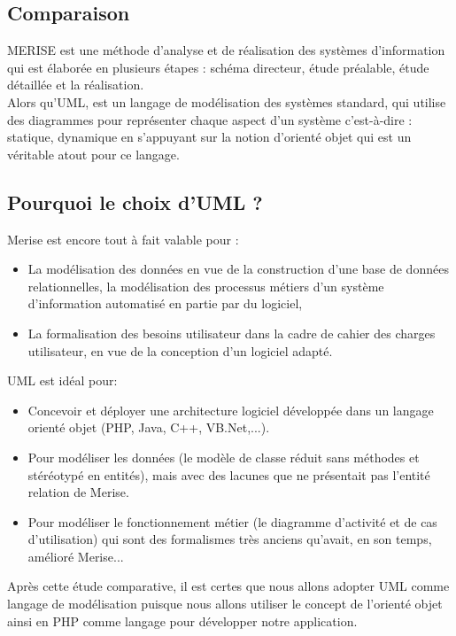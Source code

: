 	\subsection{Comparaison}
		MERISE est une méthode d'analyse et de réalisation des systèmes d'information qui est élaborée en plusieurs étapes : schéma directeur, étude préalable, étude détaillée et la réalisation.\\
		Alors qu'UML, est un langage de modélisation des systèmes standard, qui utilise des diagrammes pour représenter chaque aspect d'un système c'est-à-dire : statique, dynamique en s'appuyant sur la notion d'orienté objet qui est un véritable atout pour ce langage.
	\subsection{Pourquoi le choix d'UML ?}
	
	Merise est encore tout à fait valable pour :
	
	\begin{itemize}
		\item La modélisation des données en vue de la construction d'une base de données relationnelles, la modélisation des processus métiers d'un système d'information automatisé en partie par du logiciel,
		\item La formalisation des besoins utilisateur dans la cadre de cahier des charges utilisateur, en vue de la conception d'un logiciel adapté.
	\end{itemize}
	
	UML est idéal pour:
	
	\begin{itemize}
		\item Concevoir et déployer une architecture logiciel développée dans un langage orienté objet (PHP, Java, C++, VB.Net,...).
		\item Pour modéliser les données (le modèle de classe réduit sans méthodes et stéréotypé en entités), mais avec des lacunes que ne présentait pas l'entité relation de Merise.
		\item Pour modéliser le fonctionnement métier (le diagramme d'activité et de cas d'utilisation) qui sont des formalismes très anciens qu'avait, en son temps, amélioré Merise...
	\end{itemize}
	
	Après cette étude comparative, il est certes que nous allons adopter UML comme langage de modélisation puisque nous allons utiliser le concept de l'orienté objet ainsi en PHP comme langage pour développer notre application.
		
